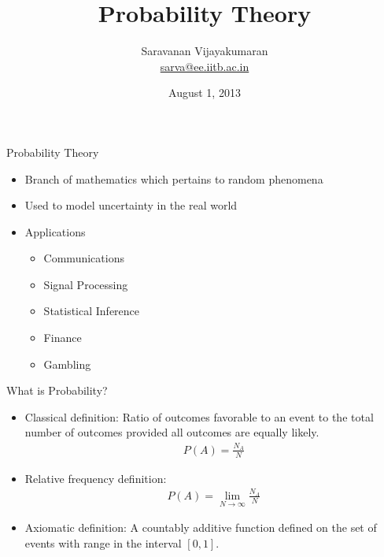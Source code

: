 \documentclass[t]{beamer}
\title[EE 703 DMT]{Probability Theory}
\author[Saravanan V]
{
  Saravanan Vijayakumaran\\
  \href{mailto:sarva@ee.iitb.ac.in}{sarva@ee.iitb.ac.in}
}
\institute[IIT Bombay]
{
  Department of Electrical Engineering\\
  Indian Institute of Technology Bombay
}
\date{August 1, 2013}
\begin{document}
\begin{frame}
  \titlepage
\end{frame}

\begin{frame}{Probability Theory}
  \footnotesize
  \begin{itemize}
    \item Branch of mathematics which pertains to random phenomena
    \item \pause Used to model uncertainty in the real world
    \item \pause Applications
      \begin{itemize}
        \scriptsize
        \item \pause Communications
        \item \pause Signal Processing
        \item \pause Statistical Inference
        \item \pause Finance
        \item \pause Gambling
      \end{itemize}
  \end{itemize}
  \normalsize
\end{frame}

\begin{frame}{What is Probability?}
  \footnotesize
  \begin{itemize}
    \item \pause Classical definition: Ratio of outcomes favorable to an event to the total number of outcomes provided all outcomes are equally likely.
      \begin{eqnarray*}
        P(A) = \frac{N_A}{N}
      \end{eqnarray*}
    \item \pause Relative frequency definition:
      \begin{eqnarray*}
        P(A) = \lim_{N \rightarrow \infty} \frac{N_A}{N}
      \end{eqnarray*}
    \item \pause Axiomatic definition: A countably additive function defined on the set of events with range in the interval $[0,1]$.
  \end{itemize}
  \normalsize
\end{frame}
\end{document}
